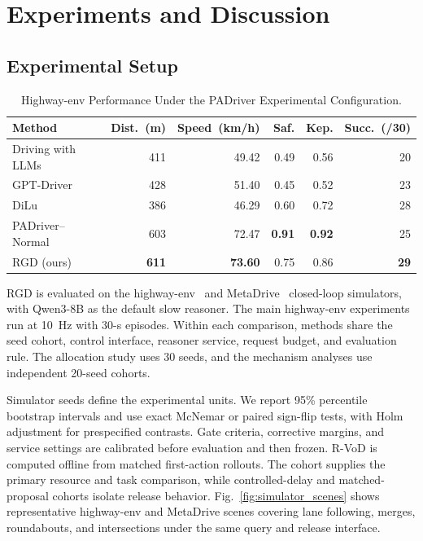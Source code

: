 \documentclass[letterpaper,journal]{IEEEtran}
\begin{document}
\section{Experiments and Discussion}
\label{sec:experiments}
\subsection{Experimental Setup}
\begin{table}[!b]
\caption{Highway-env Performance Under the PADriver Experimental Configuration.}
\label{tab:padriver}
\centering
\scriptsize
\renewcommand{\arraystretch}{1.02}
\setlength{\tabcolsep}{1.0pt}
\begin{tabular*}{\linewidth}{@{\extracolsep{\fill}}lrrrrr@{}}
\toprule
\textbf{Method} & \textbf{Dist.~(m)} & \textbf{Speed~(km/h)} &
\textbf{Saf.} & \textbf{Kep.} & \textbf{Succ.~(/30)}\\
\midrule
Driving with LLMs & 411 & 49.42 & 0.49 & 0.56 & 20\\
GPT-Driver & 428 & 51.40 & 0.45 & 0.52 & 23\\
DiLu & 386 & 46.29 & 0.60 & 0.72 & 28\\
PADriver--Normal & 603 & 72.47 & \textbf{0.91} & \textbf{0.92} & 25\\
RGD (ours) & \textbf{611} & \textbf{73.60} & 0.75 & 0.86 & \textbf{29}\\
\bottomrule
\end{tabular*}
\end{table}
RGD is evaluated on the highway-env~\cite{lesort2018highwayenv} and
MetaDrive~\cite{li2023metadrive} closed-loop simulators, with Qwen3-8B
\cite{qwen3technicalreport} as the default slow reasoner. The main highway-env
experiments run at 10~Hz with 30-s episodes. Within each comparison, methods
share the seed cohort, control interface, reasoner service, request budget, and
evaluation rule. The allocation study uses 30 seeds, and the mechanism
analyses use independent 20-seed cohorts.

Simulator seeds define the experimental units. We report 95\% percentile
bootstrap intervals and use exact McNemar or paired sign-flip tests, with Holm
adjustment for prespecified contrasts. Gate criteria, corrective margins, and
service settings are calibrated before evaluation and then frozen. R-VoD is
computed offline from matched first-action rollouts. The cohort supplies
the primary resource and task comparison, while controlled-delay and
matched-proposal cohorts isolate release behavior. Fig.~\ref{fig:simulator_scenes}
shows representative highway-env and MetaDrive scenes covering lane following,
merges, roundabouts, and intersections under the same query and release interface.
\end{document}
